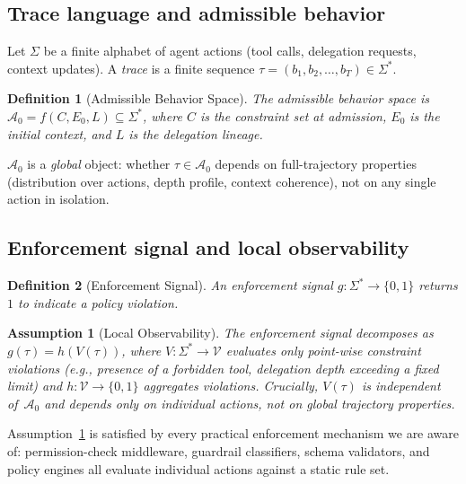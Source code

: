 \documentclass[11pt]{article}
\newtheorem{definition}{Definition}[section]
\newtheorem{assumption}{Assumption}[section]
\newcommand{\Sigstar}{\Sigma^{*}}
\newcommand{\Azero}{\mathcal{A}_0}
\begin{document}
\subsection{Trace language and admissible behavior}

Let $\Sigma$ be a finite alphabet of agent actions (tool calls, delegation
requests, context updates).  A \emph{trace} is a finite sequence
$\tau = (b_1, b_2, \ldots, b_T) \in \Sigstar$.

\begin{definition}[Admissible Behavior Space]
\label{def:A0}
The \emph{admissible behavior space} is $\Azero = f(C, E_0, L) \subseteq \Sigstar$,
where $C$ is the constraint set at admission, $E_0$ is the initial context, and
$L$ is the delegation lineage.
\end{definition}

$\Azero$ is a \emph{global} object: whether $\tau \in \Azero$ depends on
full-trajectory properties (distribution over actions, depth profile, context
coherence), not on any single action in isolation.

\subsection{Enforcement signal and local observability}

\begin{definition}[Enforcement Signal]
\label{def:enforcement}
An \emph{enforcement signal} $g : \Sigstar \to \{0,1\}$ returns $1$ to
indicate a policy violation.
\end{definition}

\begin{assumption}[Local Observability]
\label{asm:local}
The enforcement signal decomposes as $g(\tau) = h(V(\tau))$,
where $V : \Sigstar \to \mathcal{V}$ evaluates only
\emph{point-wise constraint violations}
(e.g., presence of a forbidden tool, delegation depth exceeding a fixed limit)
and $h : \mathcal{V} \to \{0,1\}$ aggregates violations.
Crucially, $V(\tau)$ is independent of~$\Azero$ and depends only on
individual actions, not on global trajectory properties.
\end{assumption}

Assumption~\ref{asm:local} is satisfied by every practical enforcement
mechanism we are aware of: permission-check middleware, guardrail classifiers,
schema validators, and policy engines all evaluate individual actions against
a static rule set.
\end{document}
